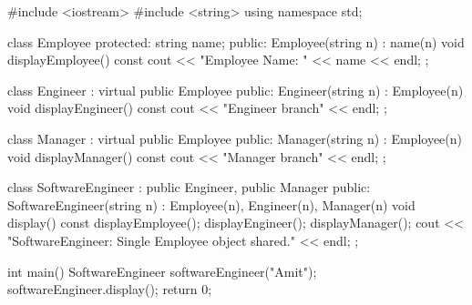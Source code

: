 
\codelabel

\begin{code}
#include <iostream>
#include <string>
using namespace std;

class Employee {
protected:
    string name;
public:
    Employee(string n) : name(n) {}
    void displayEmployee() const { cout << "Employee Name: " << name << endl; }
};

class Engineer : virtual public Employee {
public:
    Engineer(string n) : Employee(n) {}
    void displayEngineer() const { cout << "Engineer branch" << endl; }
};

class Manager : virtual public Employee {
public:
    Manager(string n) : Employee(n) {}
    void displayManager() const { cout << "Manager branch" << endl; }
};

class SoftwareEngineer : public Engineer, public Manager {
public:
    SoftwareEngineer(string n) : Employee(n), Engineer(n), Manager(n) {}
    void display() const {
        displayEmployee(); displayEngineer(); displayManager();
        cout << "SoftwareEngineer: Single Employee object shared." << endl;
    }
};

int main() {
    SoftwareEngineer softwareEngineer("Amit");
    softwareEngineer.display();
    return 0;
}
\end{code}

\outputlabel
{}
